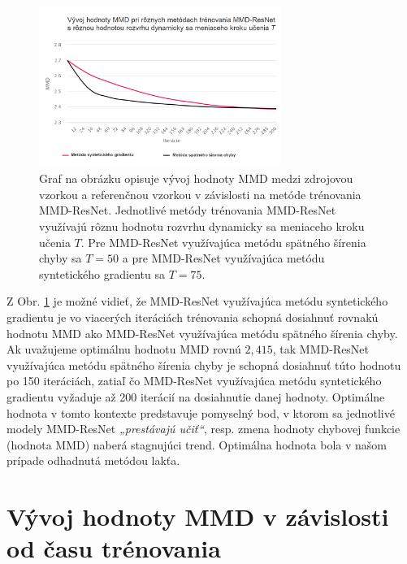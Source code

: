 \begin{figure}
\centerline{\includegraphics[width=0.7\textwidth]{images/experimenty/experiment5.png}}
\caption[Vývoj hodnoty MMD pri rôznych metódach trénovania MMD-ResNet s rôznou hodnotou rozvrhu dynamicky sa meniaceho kroku učenia $T$]{Graf na obrázku opisuje vývoj hodnoty MMD medzi zdrojovou vzorkou a referenčnou vzorkou v závislosti na metóde trénovania MMD-ResNet. Jednotlivé metódy trénovania MMD-ResNet využívajú rôznu hodnotu rozvrhu dynamicky sa meniaceho kroku učenia $T$. Pre MMD-ResNet využívajúca metódu spätného šírenia chyby sa $T=50$ a pre MMD-ResNet využívajúca metódu syntetického gradientu sa $T=75$.}
\label{vysledok5}
\end{figure}

Z Obr. \ref{vysledok5} je možné vidieť, že MMD-ResNet využívajúca metódu syntetického gradientu je vo viacerých iteráciách trénovania schopná dosiahnuť rovnakú hodnotu MMD ako MMD-ResNet využívajúca metódu spätného šírenia chyby. Ak uvažujeme optimálnu hodnotu MMD rovnú $2,415$, tak MMD-ResNet využívajúca metódu spätného šírenia chyby je schopná dosiahnuť túto hodnotu po 150 iteráciách, zatiaľ čo MMD-ResNet využívajúca metódu syntetického gradientu vyžaduje až 200 iterácií na dosiahnutie danej hodnoty. Optimálne hodnota v tomto kontexte predstavuje pomyselný bod, v ktorom sa jednotlivé modely MMD-ResNet \textit{„prestávajú učiť“}, resp. zmena hodnoty chybovej funkcie (hodnota MMD) naberá stagnujúci trend. Optimálna hodnota bola v našom prípade odhadnutá metódou lakťa.

\section{Vývoj hodnoty MMD v závislosti od času trénovania}
\label{vyvoj_MMD_v_case}

